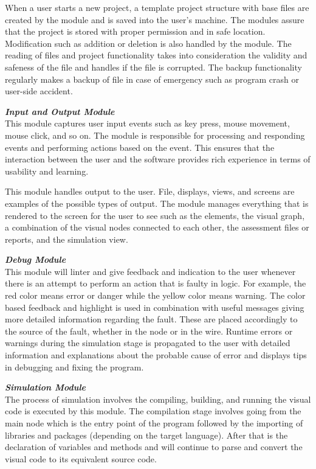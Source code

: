 \parx
When a user starts a new project, a template project structure with base files are
created by the module and is saved into the user's machine. The modules assure that
the project is stored with proper permission and in safe location. Modification such
as addition or deletion is also handled by the module. The reading of files and
project functionality takes into consideration the validity and safeness of the file
and handles if the file is corrupted. The backup functionality regularly makes
a backup of file in case of emergency such as program crash or user-side accident.

\flushleft
\textbf{\textit{Input and Output Module}}\\
\justifying
\parx
This module captures user input events such as key press, mouse movement, mouse
click, and so on. The module is responsible for processing and responding events and
performing actions based on the event. This ensures that the interaction between the
user and the software provides rich experience in terms of usability and learning.

\parx
This module handles output to the user. File, displays, views, and screens are examples
of the possible types of output. The module manages everything that is rendered to the
screen for the user to see such as the elements, the visual graph, a combination of the
visual nodes connected to each other, the assessment files or reports, and the
simulation view.

\flushleft
\textbf{\textit{Debug Module}}\\
\justifying
\parx
This module will linter and give feedback and indication to the user whenever there
is an attempt to perform an action that is faulty in logic. For example, the red
color means error or danger while the yellow color means warning. The color based
feedback and highlight is used in combination with useful messages giving more
detailed information regarding the fault. These are placed accordingly to the source
of the fault, whether in the node or in the wire. Runtime errors or warnings during
the simulation stage is propagated to the user with detailed information and
explanations about the probable cause of error and displays tips in debugging and
fixing the program.

\flushleft
\textbf{\textit{Simulation Module}}\\
\justifying
\parx
The process of simulation involves the compiling, building, and running the visual
code is executed by this module. The compilation stage involves going from the main
node which is the entry point of the program followed by the importing of libraries
and packages (depending on the target language).  After that is the declaration of
variables and methods and will continue to parse and convert the visual code to its
equivalent source code.

